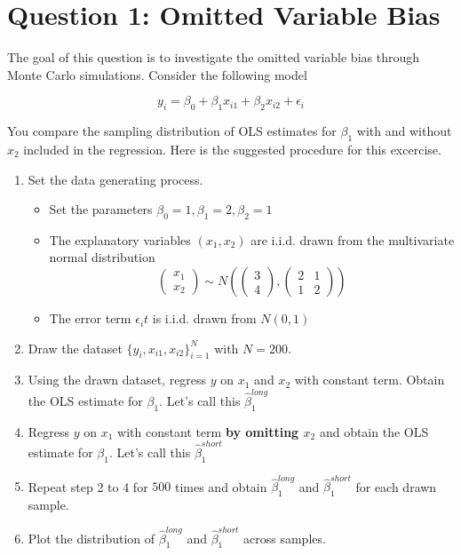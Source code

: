 \documentclass[]{book}
\providecommand{\tightlist}{%
  \setlength{\itemsep}{0pt}\setlength{\parskip}{0pt}}
\begin{document}
\section{Question 1: Omitted Variable
Bias}\label{question-1-omitted-variable-bias}

The goal of this question is to investigate the omitted variable bias
through Monte Carlo simulations. Consider the following model

\[
y_i = \beta_0 + \beta_1 x_{i1} + \beta_2 x_{i2} + \epsilon_i
\]

You compare the sampling distribution of OLS estimates for \(\beta_1\)
with and without \(x_2\) included in the regression. Here is the
suggested procedure for this excercise.

\begin{enumerate}
\def\labelenumi{\arabic{enumi}.}
\tightlist
\item
  Set the data generating process.

  \begin{itemize}
  \tightlist
  \item
    Set the parameters \(\beta_0 = 1, \beta_1 = 2, \beta_2 = 1\)
  \item
    The explanatory variables \((x_1, x_2)\) are i.i.d. drawn from the
    multivariate normal distribution \[
    \left(\begin{array}{c}
    x_{1}\\
    x_{2}
    \end{array}\right)\sim N\left(\left(\begin{array}{c}
    3\\
    4
    \end{array}\right),\left(\begin{array}{cc}
    2 & 1\\
    1 & 2
    \end{array}\right)\right)
    \]
  \item
    The error term \(\epsilon_it\) is i.i.d. drawn from \(N(0, 1)\)
  \end{itemize}
\item
  Draw the dataset \(\{y_i, x_{i1}, x_{i2} \}_{i=1}^N\) with
  \(N = 200\).
\item
  Using the drawn dataset, regress \(y\) on \(x_1\) and \(x_2\) with
  constant term. Obtain the OLS estimate for \(\beta_1\). Let's call
  this \(\hat\beta_1^{long}\)
\item
  Regress \(y\) on \(x_1\) with constant term \textbf{by omitting
  \(x_2\)} and obtain the OLS estimate for \(\beta_1\). Let's call this
  \(\hat\beta_1^{short}\)\\
\item
  Repeat step 2 to 4 for \(500\) times and obtain \(\hat\beta_1^{long}\)
  and \(\hat\beta_1^{short}\) for each drawn sample.
\item
  Plot the distribution of \(\hat\beta_1^{long}\) and
  \(\hat\beta_1^{short}\) across samples.
\end{enumerate}
\end{document}
